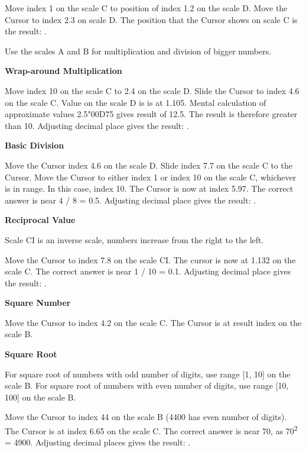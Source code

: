 \begin{multicols*}{3}
{
Move index 1 on the scale C to position of index 1.2 on the scale D.
Move the Cursor to index 2.3 on scale D.
The position that the Cursor shows on scale C is the result: .

\footnotesize Use the scales A and B for multiplication and division of bigger numbers.
\normalsize

  \textbf{Wrap-around Multiplication}

Move index 10 on the scale C to 2.4 on the scale D.
Slide the Cursor to index 4.6 on the scale C.
Value on the scale D is is at 1.105.
Mental calculation of approximate values 2.5{\char"00D7}5 gives result of 12.5.
The result is therefore greater than 10.
Adjusting decimal place gives the result: . 

  \textbf{Basic Division}

Move the Cursor index 4.6 on the scale D.
Slide index 7.7 on the scale C to the Cursor.
Move the Cursor to either index 1 or index 10 on the scale C, whichever is in range. In this case, index 10.
The Cursor is now at index 5.97. The correct answer is near 4 / 8 = 0.5. Adjusting decimal place gives the result: .

  \textbf{Reciprocal Value}

\footnotesize Scale CI is an inverse scale, numbers increase from the right to the left. \normalsize

Move the Cursor to index 7.8 on the scale CI.
The cursor is now at 1.132 on the scale C.
The correct answer is near 1 / 10 = 0.1. Adjusting decimal place gives the result: .

  \textbf{Square Number}

Move the Cursor to index 4.2 on the scale C.
The Cursor is at result index  on the scale B.

  \textbf{Square Root}

\footnotesize For square root of numbers with odd number of digits, use range [1, 10] on the scale B. For square root of numbers with even number of digits, use range [10, 100] on the scale B. \normalsize

Move the Cursor to index 44 on the scale B (4400 has even number of digits).
The Cursor is at index 6.65 on the scale C. The correct answer is near 70, as 70\textsuperscript{2} = 4900. Adjusting decimal places gives the result: .

}
\end{multicols*}
